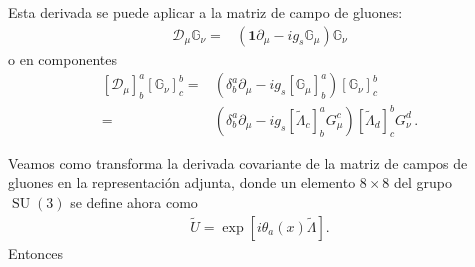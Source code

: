 Esta derivada se puede aplicar a la matriz de campo de gluones:
\begin{align}
  \mathcal{D}_{\mu}  \mathbb{G}_{\nu}=& \left(\mathbf{1}\partial_{\mu}-i g_s \mathbb{G}_{\mu} \right)\mathbb{G}_{\nu}
\end{align}
o en componentes
\begin{align}
  \left[ \mathcal{D}_{\mu} \right]^{a}_{b} \left[ \mathbb{G}_{\nu} \right]^b_c=& \left(\delta^a_b\partial_{\mu}-i g_s \left[ \mathbb{G}_{\mu} \right]^{a}_{b} \right)\left[ \mathbb{G}_{\nu} \right]^b_c \nonumber\\
    =& \left(\delta^a_b\partial_{\mu}-i g_s \left[  \widetilde{\Lambda}_c \right]^a_b G^c_{\mu} \right) \left[  \widetilde{\Lambda}_d \right]^b_cG_{\nu}^{d}\,.
\end{align}

Veamos como transforma la derivada covariante de la matriz de campos de gluones en la representación adjunta, donde un elemento $8\times 8$ del grupo $\operatorname{SU}(3)$ se define ahora como
\begin{align}
  \widetilde{U}=\exp \left[ i\theta_a(x) \widetilde{\Lambda} \right].
\end{align}
Entonces
